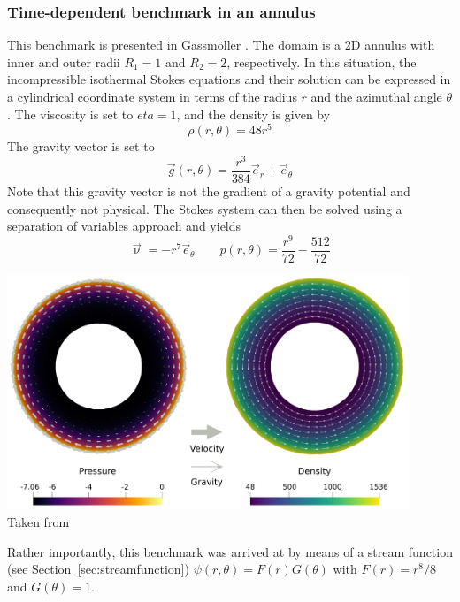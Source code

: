 \subsubsection{Time-dependent benchmark in an annulus}\label{sec:tdba}

This benchmark is presented in Gass{m\"o}ller \etal \cite{galb19}.
The domain is a 2D annulus with inner and outer radii $R_1=1$ and $R_2=2$, respectively.
In this situation, the incompressible isothermal Stokes equations and their solution
can be expressed in a cylindrical coordinate system in terms of the radius $r$ and the
azimuthal angle $\theta$. The viscosity is set to $eta=1$, and the density is given by
\begin{equation}
\rho(r,\theta)=48r^5
\end{equation}
The gravity vector is set to 
\begin{equation}
\vec{g}(r,\theta)=\frac{r^3}{384} \vec{e}_r + \vec{e}_\theta
\end{equation}
Note that this gravity vector is not the gradient of a gravity potential
and consequently not physical.
The Stokes system can then be solved using a separation of variables
approach and yields
\begin{equation}
\vec{\upnu}=-r^7 \vec{e}_\theta
\quad\quad
p(r,\theta)=\frac{r^9}{72}-\frac{512}{72}
\end{equation}
\begin{center}
\includegraphics[width=12cm]{images/benchmark_annulus/galb19}\\
{\captionfont Taken from \cite{galb19}}
\end{center}
Rather importantly, this benchmark was arrived at by means of a stream function (see Section~\ref{sec:streamfunction}) 
$\psi(r,\theta)=F(r)G(\theta)$ with $F(r)=r^8/8$ and $G(\theta)=1$.


